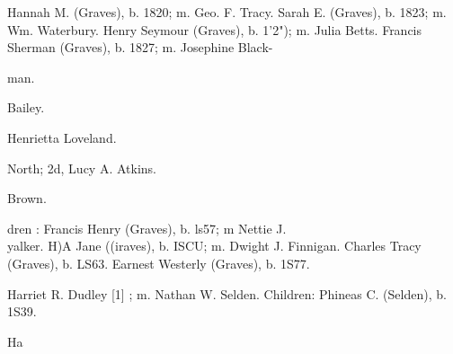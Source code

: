 \documentclass{book}
\begin{document}
Hannah M. (Graves), b. 1820; m. Geo. F. Tracy. 
Sarah E. (Graves), b. 1823; m. Wm. Waterbury. 
Henry Seymour (Graves), b. 1'2"); m. Julia Betts. 
Francis Sherman (Graves), b. 1827; m. Josephine Black- 

man. 










Bailey. 





Henrietta Loveland. 





North; 2d, Lucy A. Atkins. 















Brown. 

dren : 
Francis Henry (Graves), b. ls57; m Nettie J. \\yalker. 
H)A Jane ((iraves), b. ISCU; m. Dwight J. Finnigan. 
Charles Tracy (Graves), b. LS63. 
Earnest Westerly (Graves), b. 1S77. 

Harriet R. Dudley [1] ; m. Nathan W. Selden. Children: 
Phineas C. (Selden), b. 1S39. 





























Ha 
\end{document}
